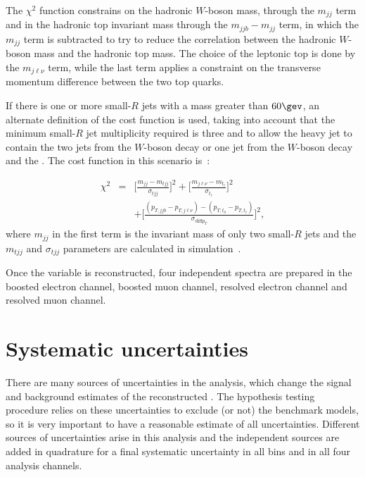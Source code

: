 The $\chi^2$ function constrains on the hadronic $W$-boson mass,
through the $m_{jj}$ term and in the hadronic top invariant mass through the $m_{jjb} - m_{jj}$ term,
in which the $m_{jj}$ term is subtracted to try to reduce the correlation between the hadronic $W$-boson mass and the hadronic top mass.
The choice of the leptonic top \bjet is done by the $m_{j\ell\nu}$ term, while the last term applies a constraint on the transverse momentum difference between the two
top quarks.

If there is one or more small-$R$ jets with a mass greater than $60\gev$, an alternate definition of the cost function is used, taking into
account that the minimum small-$R$ jet multiplicity required is three and to allow the heavy jet to contain the two jets from the $W$-boson decay
or one jet from the $W$-boson decay and the \bjet. The cost function in this scenario is~\cite{ttres7paper}:

\begin{eqnarray}
\displaystyle
\chi^2&=&\Big[\frac{m_{jj} - m_{tjj}}{\sigma_{tjj}}\Big]^2 + \Big[\frac{m_{j\ell\nu} - m_{t_\ell}}{\sigma_{t_\ell}}\Big]^2 \nonumber \\
&&+ \Big[\frac{(p_{T,jjb} - p_{T,j\ell\nu}) - (p_{T,t_h} - p_{T,t_\ell})}{\sigma_{\textrm{diff} p_T}}\Big]^2,
\label{eq:mtt_resolved_hm}
\end{eqnarray}
where $m_{jj}$ in the first term is the invariant mass of only two small-$R$ jets and the $m_{tjj}$ and $\sigma_{tjj}$ parameters are calculated in simulation~\cite{ttres7paper}.

Once the \mtt variable is reconstructed, four independent spectra are prepared in the boosted electron channel, boosted muon channel, resolved electron channel and resolved
muon channel.

\section{Systematic uncertainties}
\label{sec:ttbarres7_syst}

There are many sources of uncertainties in the analysis, which change the signal and background estimates of the reconstructed \mtt.
The hypothesis testing procedure relies on these uncertainties to exclude (or not) the benchmark models, so it is very important to have a reasonable estimate of
all uncertainties. Different sources of uncertainties arise in this analysis and the independent sources are added in quadrature for a final systematic
uncertainty in all \mtt bins and in all four analysis channels.

